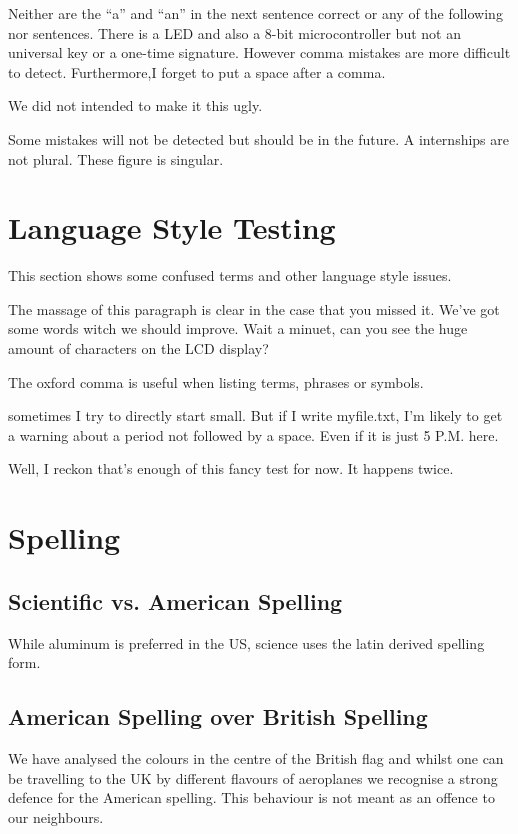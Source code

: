 \documentclass{scrartcl}
\begin{document}
Neither are the “a” and “an” in the next sentence correct or any of the following nor sentences.
There is a LED and also a 8-bit microcontroller but not an universal key or a one-time signature.
However comma mistakes are more difficult to detect.
Furthermore,I forget to put a space after a comma.

We did not intended to make it this ugly.

Some mistakes will not be detected but should be in the future.
A internships are not plural. These figure is singular.






\section{Language Style Testing}
This section shows some confused terms and other language style issues.

The massage of this paragraph is clear in the case that you missed it. We've got some words witch we should improve.
Wait a minuet, can you see the huge amount of characters on the LCD display? 

The oxford comma is useful when listing terms, phrases or symbols.

sometimes I try to directly start small. But if I write myfile.txt, I'm likely to get a warning about a period not followed by a space. Even if it is just 5 P.M. here.

Well, I reckon that's enough of this fancy test for now. It happens twice. 



\section{Spelling}

\subsection{Scientific vs. American Spelling}
While aluminum is preferred in the US, science uses the latin derived spelling form.


\subsection{American Spelling over British Spelling}
We have analysed the 
colours in the 
centre of the British flag 
and whilst one can 
be travelling to the UK 
by different flavours
of aeroplanes we 
recognise a strong
defence for the American spelling.
This behaviour is 
not meant as an offence to
our neighbours.
\end{document}
